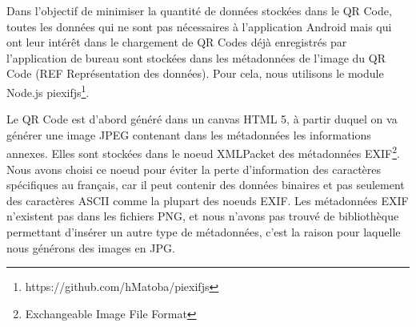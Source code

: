 \par
Dans l'objectif de minimiser la quantité de données stockées dans le QR Code, toutes les données qui ne sont pas nécessaires à l'application Android mais qui ont leur intérêt dans le chargement de QR Codes déjà enregistrés par l'application de bureau sont stockées dans les métadonnées de l'image du QR Code (REF Représentation des données). Pour cela, nous utilisons le module Node.js piexifjs\footnote{https://github.com/hMatoba/piexifjs}.\\
\par
Le QR Code est d'abord généré dans un canvas HTML 5, à partir duquel on va générer une image JPEG contenant dans les métadonnées les informations annexes. Elles sont stockées dans le noeud XMLPacket des métadonnées EXIF\footnote{Exchangeable Image File Format}. Nous avons choisi ce noeud pour éviter la perte d'information des caractères spécifiques au français, car il peut contenir des données binaires et pas seulement des caractères ASCII comme la plupart des noeuds EXIF. Les métadonnées EXIF n'existent pas dans les fichiers PNG, et nous n'avons pas trouvé de bibliothèque permettant d'insérer un autre type de métadonnées, c'est la raison pour laquelle nous générons des images en JPG.